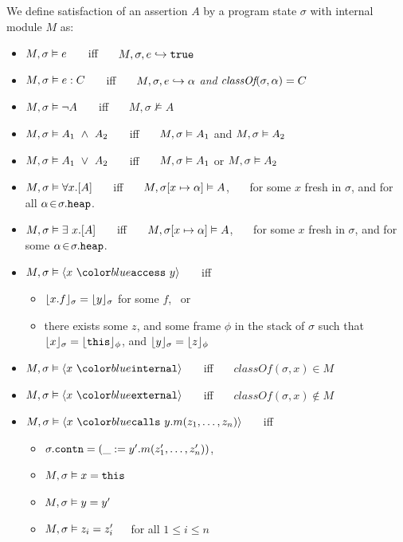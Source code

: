 \begin{definition} 
\label{def:chainmail-semantics}
We define satisfaction of an assertion $A$ by a program state $\sigma$ with internal module $M$ as:
\begin{itemize}
\item
$M , \sigma \vDash e$ \ \ \ iff \ \ \  $M, \sigma, e \hookrightarrow \texttt{true}$
\item
$M , \sigma \vDash e : C$ \ \ \ iff \ \ \  $M, \sigma, e \hookrightarrow \alpha$ \textit{and} $\textit{classOf}(\sigma, \alpha) = C$
\item
$M , \sigma \vDash \neg A$ \ \ \ iff \ \ \  ${M},{\sigma}\nvDash{A}$
\item
$\satisfiesA{M}{\sigma}{A_1\ \wedge\ A_2}$ \ \ \ iff \ \ \  $M , \sigma \vDash A_1$ and 
$M , \sigma \vDash A_2$
\item
$\satisfiesA{M}{\sigma}{A_1\ \vee\ A_2}$ \ \ \ iff \ \ \  $M , \sigma \vDash A_1$ or 
$M , \sigma \vDash A_2$
\item
$M , \sigma \vDash \forall x.[A]$ \ \ \ iff \ \ \  
$M , \sigma[x \mapsto \alpha] \vDash A$, \ 
\ \ for some $x$ fresh in $\sigma$, and for all $\alpha\!\in\!\sigma.{\texttt{heap}}$.
\item
$M , \sigma \vDash \exists\ x.[A]$ \ \ \ iff \ \ \  
$M , \sigma[x \mapsto \alpha] \vDash A$, \ 
\ \ for some $x$ fresh in $\sigma$, and for some $ \alpha\!\in\!\sigma.{\texttt{heap}}$. 
\item
$\satisfiesA{M}{\sigma}{\access{x}{y}}$ \ \ \ iff \ \ \  
\begin{itemize}
\item
$\lfloor x.f \rfloor_{\sigma}={\lfloor y \rfloor_{\sigma}}$ for some $f$, \  or
\item
there exists some $z$, and some frame $\phi$ in the stack of $\sigma$ such that {$\lfloor x \rfloor_{\sigma}=\lfloor {\texttt{this}} \rfloor_{\phi}$}, {and $\lfloor y \rfloor_{\sigma}=\lfloor z \rfloor_{\phi}$}
\end{itemize}
\item
$\satisfiesA{M}{\sigma}{\internal{x}}$ \ \ \ iff \ \ \  
$\textit{classOf}(\sigma,x) \in M$
\item
$\satisfiesA{M}{\sigma}{\external{x}}$ \ \ \ iff \ \ \  
$\textit{classOf}(\sigma,x) \not\in M$
\item
$\satisfiesA{M}{\sigma}{\calls{x}{y}{m}{z_1, \ldots, z_n}}$ \ \ \ iff \ \ \ 
\begin{itemize}
\item
$\sigma.{\texttt{contn}} = (\_ := y'.m(z'_1,\ldots,z'_n))$, %
\item
$M , \sigma \vDash x = {\texttt{this}}$
\item
$M , \sigma \vDash y = y'$
\item
$M , \sigma \vDash z_i = z'_i$\ \ \ for all $1\!\leq i\!\leq n$
\end{itemize}
\end{itemize}
\end{definition}

